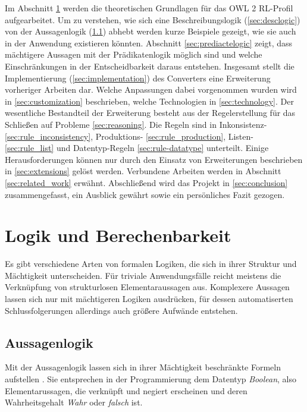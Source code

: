 \documentclass[runningheads,a4paper]{llncs}
\begin{document}
Im Abschnitt \ref{sec:logic} werden die theoretischen Grundlagen für das OWL 2 RL-Profil aufgearbeitet. 
Um zu verstehen, wie sich eine Beschreibungslogik (\ref{sec:desclogic}) von der Aussagenlogik (\ref{sec:aussagenlogik}) abhebt werden kurze Beispiele gezeigt, wie sie auch in der Anwendung existieren könnten.
Abschnitt \ref{sec:prediactelogic} zeigt, dass mächtigere Aussagen mit der Prädikatenlogik möglich sind und welche Einschränkungen in der Entscheidbarkeit daraus entstehen.
Insgesamt stellt die Implementierung (\ref{sec:implementation}) des Converters eine Erweiterung vorheriger Arbeiten dar.
Welche Anpassungen dabei vorgenommen wurden wird in \ref{sec:customization} beschrieben, welche Technologien in \ref{sec:technology}.
Der wesentliche Bestandteil der Erweiterung besteht aus der Regelerstellung für das Schließen auf Probleme \ref{sec:reasoning}.
Die Regeln sind in Inkonsistenz- \ref{sec:rule_inconsistency}, Produktions- \ref{sec:rule_production}, Listen- \ref{sec:rule_list} und Datentyp-Regeln \ref{sec:rule-datatype} unterteilt.
Einige Herausforderungen können nur durch den Einsatz von Erweiterungen beschrieben in \ref{sec:extensions} gelöst werden.
Verbundene Arbeiten werden in Abschnitt \ref{sec:related_work} erwähnt.
Abschließend wird das Projekt in \ref{sec:conclusion} zusammengefasst, ein Ausblick gewährt sowie ein persönliches Fazit gezogen.

\newpage
\section{Logik und Berechenbarkeit}
\label{sec:logic}

Es gibt verschiedene Arten von formalen Logiken, die sich in ihrer Struktur und Mächtigkeit unterscheiden.
Für triviale Anwendungsfälle reicht meistens die Verknüpfung von strukturlosen Elementaraussagen aus.
Komplexere Aussagen lassen sich nur mit mächtigeren Logiken ausdrücken, für dessen automatiserten Schlussfolgerungen allerdings auch größere Aufwände entstehen.

\subsection{Aussagenlogik}
\label{sec:aussagenlogik}

Mit der Aussagenlogik lassen sich in ihrer Mächtigkeit beschränkte Formeln aufstellen \cite[p. 6,373]{foundations}. Sie entsprechen in der Programmierung dem Datentyp \textit{Boolean}, also Elementarussagen, die verknüpft und negiert erscheinen und deren Wahrheitsgehalt \textit{Wahr} oder \textit{falsch} ist.
\end{document}
